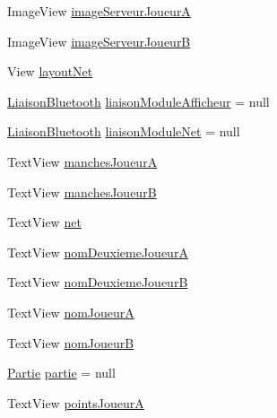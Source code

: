 \begin{DoxyCompactItemize}
\item 
Image\+View \hyperlink{classcom_1_1example_1_1area_1_1_i_h_m_gestion_partie_a811fe6ba189ad62350a6e95c3147a1f0}{image\+Serveur\+JoueurA}
\item 
Image\+View \hyperlink{classcom_1_1example_1_1area_1_1_i_h_m_gestion_partie_a0b78d5ef6419187b3b24a2ab7db7dcea}{image\+Serveur\+JoueurB}
\item 
View \hyperlink{classcom_1_1example_1_1area_1_1_i_h_m_gestion_partie_ae9b9e3bd68c744139fe5b2300528beab}{layout\+Net}
\item 
\hyperlink{classcom_1_1example_1_1area_1_1_liaison_bluetooth}{Liaison\+Bluetooth} \hyperlink{classcom_1_1example_1_1area_1_1_i_h_m_gestion_partie_a126a48e2f28ff098e20f0efb4700145f}{liaison\+Module\+Afficheur} = null
\item 
\hyperlink{classcom_1_1example_1_1area_1_1_liaison_bluetooth}{Liaison\+Bluetooth} \hyperlink{classcom_1_1example_1_1area_1_1_i_h_m_gestion_partie_a20e5bc638f1bd45e80bbadca8e8ec28f}{liaison\+Module\+Net} = null
\item 
Text\+View \hyperlink{classcom_1_1example_1_1area_1_1_i_h_m_gestion_partie_ac30dccc72d814c0d1eb36aeb5f5bdc1f}{manches\+JoueurA}
\item 
Text\+View \hyperlink{classcom_1_1example_1_1area_1_1_i_h_m_gestion_partie_ae60c32d48a9fe634358fae66d760a573}{manches\+JoueurB}
\item 
Text\+View \hyperlink{classcom_1_1example_1_1area_1_1_i_h_m_gestion_partie_ac097d7bed4ac981338629a28c0d70c1d}{net}
\item 
Text\+View \hyperlink{classcom_1_1example_1_1area_1_1_i_h_m_gestion_partie_a00dbc2ac1396af550520dd011d8e01cc}{nom\+Deuxieme\+JoueurA}
\item 
Text\+View \hyperlink{classcom_1_1example_1_1area_1_1_i_h_m_gestion_partie_a68aa62c03f3280a8f22d84e1701c1c3e}{nom\+Deuxieme\+JoueurB}
\item 
Text\+View \hyperlink{classcom_1_1example_1_1area_1_1_i_h_m_gestion_partie_ad7ac57a177098fba4ba7ea29a2418f10}{nom\+JoueurA}
\item 
Text\+View \hyperlink{classcom_1_1example_1_1area_1_1_i_h_m_gestion_partie_a5aba0922e5b556ebc91d67793b149f52}{nom\+JoueurB}
\item 
\hyperlink{classcom_1_1example_1_1area_1_1_partie}{Partie} \hyperlink{classcom_1_1example_1_1area_1_1_i_h_m_gestion_partie_a225e150f813f8fa5c632709a57eacc32}{partie} = null
\item 
Text\+View \hyperlink{classcom_1_1example_1_1area_1_1_i_h_m_gestion_partie_affa1414152ba72b6b19e087049e2bda8}{points\+JoueurA}

\end{DoxyCompactItemize}
